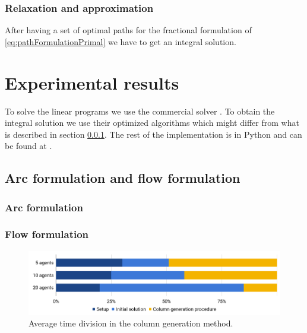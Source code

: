 \documentclass[14pt,a4paper]{article}
\theoremstyle{definition}
\numberwithin{equation}{subsection}
\begin{document}
\subsubsection{Relaxation and approximation}
\label{relaxation}

After having a set of optimal paths for the fractional formulation of \eqref{eq:pathFormulationPrimal} we have to get an integral solution.





\newpage
\section{Experimental results}

To solve the linear programs we use the commercial solver \cite{gurobi}. To obtain the integral solution we use their optimized algorithms which might differ from what is described in section \ref{relaxation}. The rest of the implementation is in Python and can be found at \cite{GIT}.

\label{results}
\subsection{Arc formulation and flow formulation}
\label{results:arcsVSflow}
\subsubsection{Arc formulation}


\subsubsection{Flow formulation}

\begin{figure}[h]
	\centering
	\includegraphics[width=\linewidth]{img/time_repartition.png}
	\caption{Average time division in the column generation method.}
	\label{fig:time repartition}
\end{figure}
\end{document}
